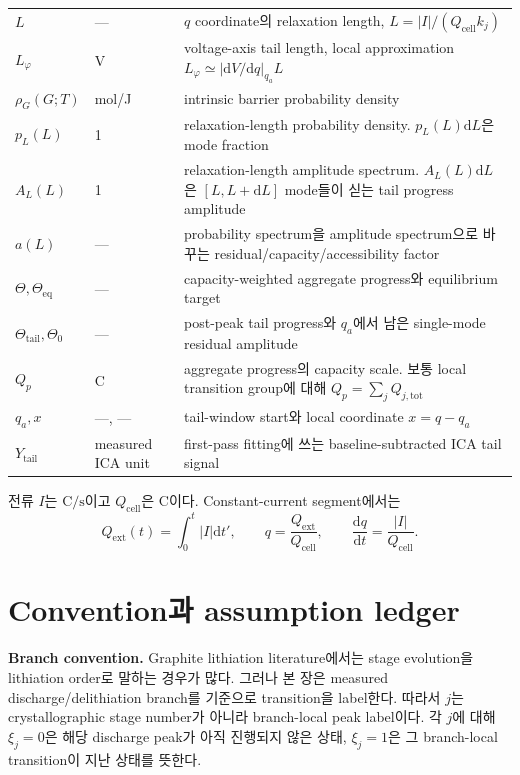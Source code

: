 \documentclass[11pt,a4paper]{article}
\newcommand{\dd}{\mathrm{d}}
\newcommand{\eq}{\mathrm{eq}}
\newcommand{\cell}{\mathrm{cell}}
\newcommand{\ext}{\mathrm{ext}}
\newcommand{\tot}{\mathrm{tot}}
\newcommand{\tail}{\mathrm{tail}}
\begin{document}
\begin{longtable}{p{} p{} p{}}
$L$ & --- & $q$ coordinate의 relaxation length, $L=|I|/(Q_{\cell}k_j)$ \\
$L_\varphi$ & V & voltage-axis tail length, local approximation $L_\varphi\simeq |\dd V/\dd q|_{q_a}L$ \\
$\rho_G(G;T)$ & mol/J & intrinsic barrier probability density \\
$p_L(L)$ & 1 & relaxation-length probability density. $p_L(L)\dd L$은 mode fraction \\
$A_L(L)$ & 1 & relaxation-length amplitude spectrum. $A_L(L)\dd L$은 $[L,L+\dd L]$ mode들이 싣는 tail progress amplitude \\
$a(L)$ & --- & probability spectrum을 amplitude spectrum으로 바꾸는 residual/capacity/accessibility factor \\
$\Theta,\Theta_{\eq}$ & --- & capacity-weighted aggregate progress와 equilibrium target \\
$\Theta_{\tail},\Theta_0$ & --- & post-peak tail progress와 $q_a$에서 남은 single-mode residual amplitude \\
$Q_p$ & C & aggregate progress의 capacity scale. 보통 local transition group에 대해 $Q_p=\sum_jQ_{j,\tot}$ \\
$q_a,x$ & ---, --- & tail-window start와 local coordinate $x=q-q_a$ \\
$Y_{\tail}$ & measured ICA unit & first-pass fitting에 쓰는 baseline-subtracted ICA tail signal \\
\bottomrule
\end{longtable}

전류 $I$는 $\mathrm{C/s}$이고 $Q_{\cell}$은 C이다. Constant-current segment에서는
\begin{equation}
Q_{\ext}(t)=\int_0^t|I|\dd t',\qquad q=\frac{Q_{\ext}}{Q_{\cell}},\qquad
\frac{\dd q}{\dd t}=\frac{|I|}{Q_{\cell}}.
\label{eq:q_time}
\end{equation}

\section{Convention과 assumption ledger}\label{sec:convention}
\textbf{Branch convention.} Graphite lithiation literature에서는 stage evolution을 lithiation order로 말하는 경우가 많다.
그러나 본 장은 measured discharge/delithiation branch를 기준으로 transition을 label한다. 따라서 $j$는 crystallographic
stage number가 아니라 branch-local peak label이다. 각 $j$에 대해 $\xi_j=0$은 해당 discharge peak가 아직 진행되지 않은 상태,
$\xi_j=1$은 그 branch-local transition이 지난 상태를 뜻한다.
\end{document}
